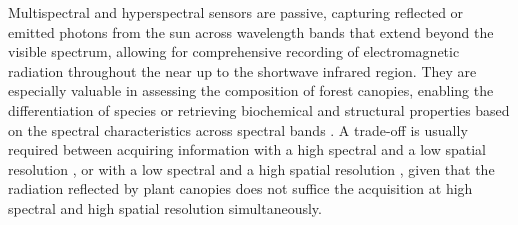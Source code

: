 \documentclass{CUP-JNL-DTM}%
\theoremstyle{definition}
\numberwithin{equation}{section}
\begin{document}
Multispectral and hyperspectral sensors are passive, capturing reflected or emitted photons \cite{mavrovic_reviews_2023} from the sun across wavelength bands that extend beyond the visible spectrum, allowing for comprehensive recording of electromagnetic radiation throughout the near up to the shortwave infrared region.
They are especially valuable in assessing the composition of forest canopies, enabling the differentiation of species or retrieving biochemical and structural properties based on the spectral characteristics  across spectral bands \cite{fassnacht_review_2016, cherif_spectra_2023}.
A trade-off is usually required between acquiring information with a high spectral and a low spatial resolution \cite{paz-kagan_multiscale_2017}, or with a low spectral and a high spatial resolution \cite{garioud_flair_2022}, given that the radiation reflected by plant canopies does not suffice the acquisition at high spectral and high spatial resolution simultaneously.
\end{document}
